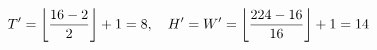\documentclass[preview]{standalone}
\begin{document}
\begin{align*}
\special{dvisvgm:raw <g id='unique000'>}T'=\left\lfloor\frac{16-2}{2}\right\rfloor+1=8,\quad H'=W'=\left\lfloor\frac{224-16}{16}\right\rfloor+1=14\special{dvisvgm:raw </g>}
\end{align*}
\end{document}
